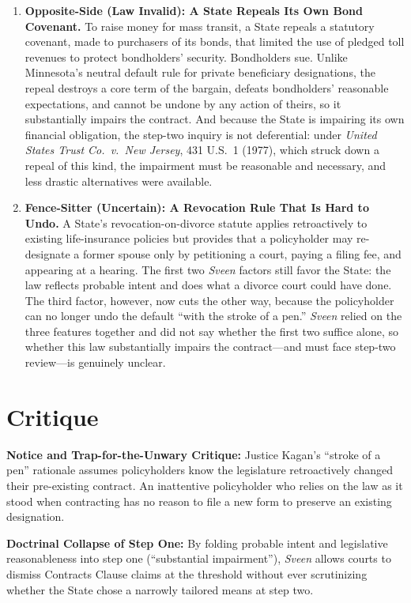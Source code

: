 \documentclass[12pt]{article}
\begin{document}
\begin{enumerate}
\item \textbf{Opposite-Side (Law Invalid): A State Repeals Its Own Bond Covenant.} To raise money for mass transit, a State repeals a statutory covenant, made to purchasers of its bonds, that limited the use of pledged toll revenues to protect bondholders' security. Bondholders sue. Unlike Minnesota's neutral default rule for private beneficiary designations, the repeal destroys a core term of the bargain, defeats bondholders' reasonable expectations, and cannot be undone by any action of theirs, so it substantially impairs the contract. And because the State is impairing its own financial obligation, the step-two inquiry is not deferential: under \textit{United States Trust Co.\ v.\ New Jersey}, 431 U.S.\ 1 (1977), which struck down a repeal of this kind, the impairment must be reasonable and necessary, and less drastic alternatives were available.

\item \textbf{Fence-Sitter (Uncertain): A Revocation Rule That Is Hard to Undo.} A State's revocation-on-divorce statute applies retroactively to existing life-insurance policies but provides that a policyholder may re-designate a former spouse only by petitioning a court, paying a filing fee, and appearing at a hearing. The first two \textit{Sveen} factors still favor the State: the law reflects probable intent and does what a divorce court could have done. The third factor, however, now cuts the other way, because the policyholder can no longer undo the default ``with the stroke of a pen.'' \textit{Sveen} relied on the three features together and did not say whether the first two suffice alone, so whether this law substantially impairs the contract---and must face step-two review---is genuinely unclear.

\end{enumerate}

\section{Critique}
\textbf{Notice and Trap-for-the-Unwary Critique:} Justice Kagan's ``stroke of a pen'' rationale assumes policyholders know the legislature retroactively changed their pre-existing contract. An inattentive policyholder who relies on the law as it stood when contracting has no reason to file a new form to preserve an existing designation.

\textbf{Doctrinal Collapse of Step One:} By folding probable intent and legislative reasonableness into step one (``substantial impairment''), \textit{Sveen} allows courts to dismiss Contracts Clause claims at the threshold without ever scrutinizing whether the State chose a narrowly tailored means at step two.
\end{document}

